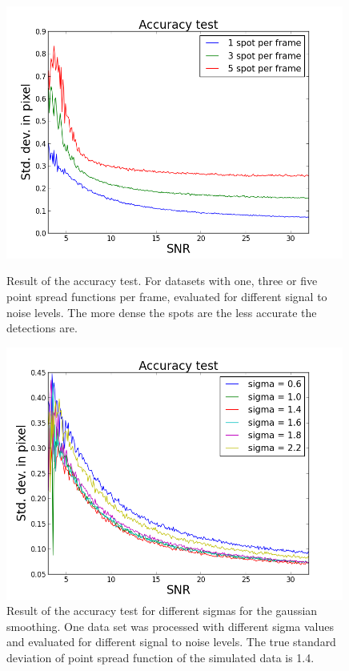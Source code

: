 \begin{figure}
\begin{minipage}[t]{0.48\textwidth}
\includegraphics[width = 0.99\textwidth]{pictures/AccuracyTest.png}
	\caption{Result of the accuracy test. For datasets with one, three or five point spread functions per frame, evaluated for different signal to noise levels. The more dense the spots are the less accurate the detections are.}
	\label{accplot}	
\end{minipage}\hfill
\begin{minipage}[t]{0.48\textwidth}
\centering
\includegraphics[width = 0.99\textwidth]{pictures/AccuracyTestSigma.png}
	\caption{Result of the accuracy test for different sigmas for the gaussian smoothing. One data set was processed with different sigma values and evaluated for different signal to noise levels. The true standard deviation of point spread function of the simulated data is 1.4.}
	\label{accplot2}

\end{minipage}
\end{figure}

